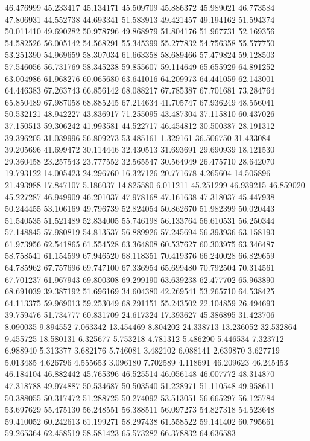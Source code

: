 46.476999
45.233417
45.134171
45.509709
45.886372
45.989021
46.773584
47.806931
44.552738
44.693341
51.583913
49.421457
49.194162
51.594374
50.011410
49.690282
50.978796
49.868979
51.804176
51.967731
52.169356
54.582526
56.005142
54.568291
55.345399
55.277832
54.756358
55.577750
53.251390
54.969659
58.307034
61.663358
58.689466
57.479824
59.128503
57.546056
56.731769
58.345238
59.855607
59.114649
65.655929
64.891252
63.004986
61.968276
60.065680
63.641016
64.209973
64.441059
62.143001
64.446383
67.263743
66.856142
68.088217
67.785387
67.701681
73.284764
65.850489
67.987058
68.885245
67.214634
41.705747
67.936249
48.556041
50.532121
48.942227
43.836917
71.255095
43.487304
37.115810
60.437026
37.150513
59.306242
41.993581
44.522717
46.454812
30.500387
28.191312
39.396205
31.039996
56.809273
53.485161
1.329161
36.506750
31.433084
39.205696
41.699472
30.114446
32.430513
31.693691
29.690939
18.121530
29.360458
23.257543
23.777552
32.565547
30.564949
26.475710
28.642070
19.793122
14.005423
24.296760
16.327126
20.771678
4.265604
14.505896
21.493988
17.847107
5.186037
14.825580
6.011211
45.251299
46.939215
46.859020
45.227287
46.949909
46.201037
47.978168
47.161638
47.318037
45.447938
50.244455
53.106169
49.796739
52.824054
50.862670
51.982399
50.020443
51.540535
51.521489
52.834005
55.746198
56.133764
56.610531
56.250344
57.148845
57.980819
54.813537
56.889926
57.245694
56.393936
63.158193
61.973956
62.541865
61.554528
63.364808
60.537627
60.303975
63.346487
58.758541
61.154599
67.946520
68.118351
70.419376
66.240028
66.829659
64.785962
67.757696
69.747100
67.336954
65.699480
70.792504
70.314561
67.701237
61.967943
69.800308
69.299190
63.639238
62.477702
65.963890
68.691039
39.387192
51.696169
34.604380
42.269541
53.265710
64.538425
64.113375
59.969013
59.253049
68.291151
55.243502
22.104859
26.494693
39.759476
51.734777
60.831709
24.617324
17.393627
45.386895
31.423706
8.090035
9.894552
7.063342
13.454469
8.804202
24.338713
13.236052
32.532864
9.455725
18.580131
6.325677
5.753218
4.781312
5.486290
5.446534
7.323712
6.988940
5.313377
3.682176
5.746081
3.482102
6.088141
2.639870
3.627719
5.013485
4.626796
4.555653
3.096180
7.702589
4.118691
46.209623
46.245453
46.184104
46.882442
45.765396
46.525514
46.056148
46.007772
48.314870
47.318788
49.974887
50.534687
50.503540
51.228971
51.110548
49.958611
50.388055
50.317472
51.288725
50.274092
53.513051
56.665297
56.125784
53.697629
55.475130
56.248551
56.388511
56.097273
54.827318
54.523648
59.410052
60.242613
61.199271
58.297438
61.558522
59.141402
60.795661
59.265364
62.458519
58.581423
65.573282
66.378832
64.636583
